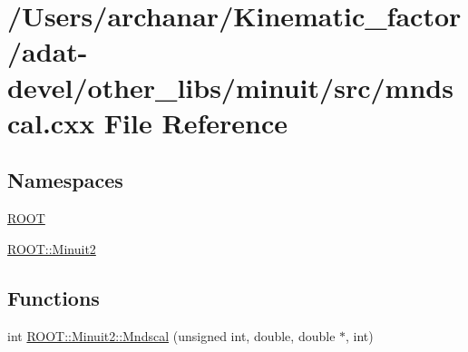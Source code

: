 \hypertarget{adat-devel_2other__libs_2minuit_2src_2mndscal_8cxx}{}\section{/\+Users/archanar/\+Kinematic\+\_\+factor/adat-\/devel/other\+\_\+libs/minuit/src/mndscal.cxx File Reference}
\label{adat-devel_2other__libs_2minuit_2src_2mndscal_8cxx}
\subsection*{Namespaces}
\begin{DoxyCompactItemize}
\item 
 \mbox{\hyperlink{namespaceROOT}{R\+O\+OT}}
\item 
 \mbox{\hyperlink{namespaceROOT_1_1Minuit2}{R\+O\+O\+T\+::\+Minuit2}}
\end{DoxyCompactItemize}
\subsection*{Functions}
\begin{DoxyCompactItemize}
\item 
int \mbox{\hyperlink{namespaceROOT_1_1Minuit2_a8d430fbbb8b24669bd04e922230451ff}{R\+O\+O\+T\+::\+Minuit2\+::\+Mndscal}} (unsigned int, double, double $\ast$, int)
\end{DoxyCompactItemize}
